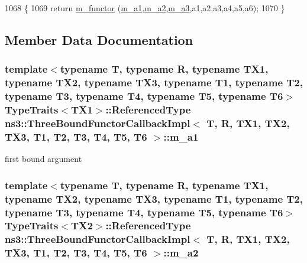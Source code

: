 \begin{DoxyCode}
1068                                                      \{
1069     \textcolor{keywordflow}{return} \hyperlink{classns3_1_1ThreeBoundFunctorCallbackImpl_aba0b9eaf53ed5db5aa306e883cadf8e8}{m\_functor} (\hyperlink{classns3_1_1ThreeBoundFunctorCallbackImpl_a0151665b6a1866a0ea061c54801e4445}{m\_a1},\hyperlink{classns3_1_1ThreeBoundFunctorCallbackImpl_acf64a084798b9a6aacefba19f259c562}{m\_a2},\hyperlink{classns3_1_1ThreeBoundFunctorCallbackImpl_a9f44c80b9158946d5d321e3e28e3dc5e}{m\_a3},a1,a2,a3,a4,a5,a6);
1070   \}
\end{DoxyCode}


\subsection{Member Data Documentation}
\subsubsection[{\texorpdfstring{m\+\_\+a1}{m_a1}}]{\setlength{\rightskip}{0pt plus 5cm}template$<$typename T, typename R, typename T\+X1, typename T\+X2, typename T\+X3, typename T1, typename T2, typename T3, typename T4, typename T5, typename T6$>$ {\bf Type\+Traits}$<$T\+X1$>$\+::Referenced\+Type {\bf ns3\+::\+Three\+Bound\+Functor\+Callback\+Impl}$<$ T, R, T\+X1, T\+X2, T\+X3, T1, T2, T3, T4, T5, T6 $>$\+::m\+\_\+a1\hspace{0.3cm}{\ttfamily [private]}}\hypertarget{classns3_1_1ThreeBoundFunctorCallbackImpl_a0151665b6a1866a0ea061c54801e4445}{}\label{classns3_1_1ThreeBoundFunctorCallbackImpl_a0151665b6a1866a0ea061c54801e4445}


first bound argument 

\subsubsection[{\texorpdfstring{m\+\_\+a2}{m_a2}}]{\setlength{\rightskip}{0pt plus 5cm}template$<$typename T, typename R, typename T\+X1, typename T\+X2, typename T\+X3, typename T1, typename T2, typename T3, typename T4, typename T5, typename T6$>$ {\bf Type\+Traits}$<$T\+X2$>$\+::Referenced\+Type {\bf ns3\+::\+Three\+Bound\+Functor\+Callback\+Impl}$<$ T, R, T\+X1, T\+X2, T\+X3, T1, T2, T3, T4, T5, T6 $>$\+::m\+\_\+a2\hspace{0.3cm}{\ttfamily [private]}}\hypertarget{classns3_1_1ThreeBoundFunctorCallbackImpl_acf64a084798b9a6aacefba19f259c562}{}\label{classns3_1_1ThreeBoundFunctorCallbackImpl_acf64a084798b9a6aacefba19f259c562}


